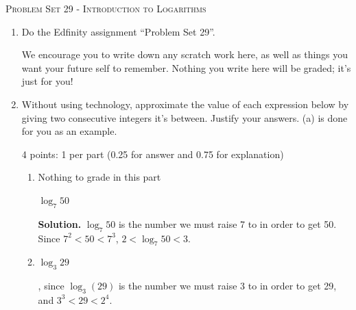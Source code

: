 \documentclass{article}
\newcommand{\doedfinity}[2][\newpage]{
  \begin{problem}[#1]
    Do the Edfinity assignment ``Problem Set #2''.

    We encourage you to write down any scratch work here, as well as
    things you want your future self to remember. Nothing you write
    here will be graded; it's just for you!
  \end{problem}
}
\begin{document}
\begin{center}
  \large\textsc{Problem Set 29 - Introduction to Logarithms}
\end{center}

\begin{enumerate}
\item  {}

  \doedfinity{29}

\item %

  Without using technology, approximate the value of each expression below by giving two consecutive integers it's between. Justify your answers. (a) is done for you as an example.

  \begin{grading}
    4 points: 1 per part (0.25 for answer and 0.75 for explanation) 
  \end{grading}

  \begin{enumerate}

  \item

    \begin{grading}
      Nothing to grade in this part
    \end{grading}

    $\log_7 50$

    \textbf{Solution.} $\log_{7} 50$ is the number we must raise 7 to in order to get 50. Since $7^2 < 50 < 7^3$, $\boxed{2 < \log_{7} 50 < 3}$.

  \item
    \begin{problem}[\vfill]
      $\log_3 29$
    \end{problem}

    \begin{solution}
      , since $\log_{3} (29) $ is the number we must raise 3 to in order to get 29, and $3^3<29< 2^4$.
    \end{solution}


\end{enumerate}
\end{enumerate}
\end{document}
